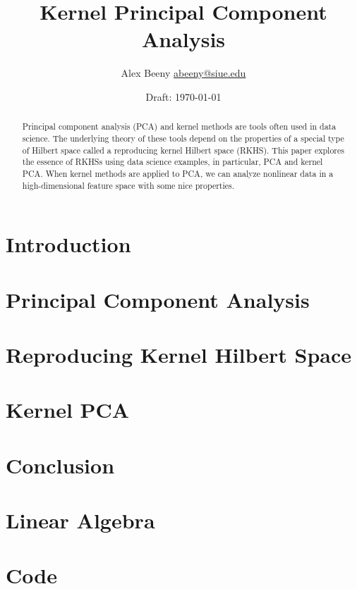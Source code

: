 \documentclass{article}
\title{Kernel Principal Component Analysis}
\author{Alex Beeny \url{abeeny@siue.edu}}
\date{Draft: \today}
\theoremstyle{definition}
\begin{document}
\maketitle
\tableofcontents
\begin{abstract}
    Principal component analysis (PCA) and kernel methods are tools often used in data science.
    The underlying theory of these tools depend on the properties of a special type of Hilbert space called a reproducing kernel Hilbert space (RKHS).
    This paper explores the essence of RKHSs using data science examples, in particular, PCA and kernel PCA.
    When kernel methods are applied to PCA, we can analyze nonlinear data in a high-dimensional feature space with some nice properties.
\end{abstract}
\section{Introduction}
\label{sec:introduction}

\section{Principal Component Analysis}
\label{sec:principal-component-analysis}

\section{Reproducing Kernel Hilbert Space}
\label{sec:reproducing-kernel-hilbert-space}

\section{Kernel PCA}
\label{sec:kernel-pca}

\section{Conclusion}
\label{sec:conclusion}

\appendix
\section{Linear Algebra}
\label{sec:linear-algebra}

% 
% 
\section{Code}
\label{sec:code}




\end{document}
